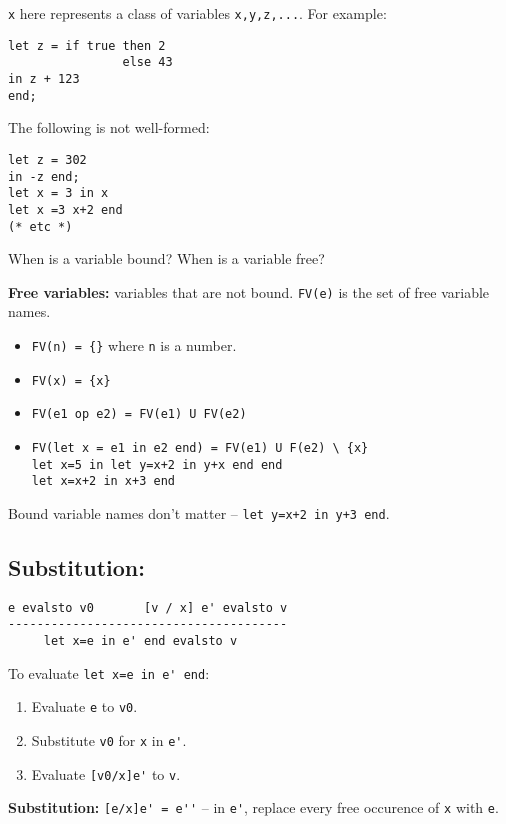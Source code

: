 \documentclass[11pt]{article}
\begin{document}
\verb~x~ here represents a class of variables \verb~x,y,z,...~. For example:
\begin{verbatim}
let z = if true then 2
                else 43
in z + 123
end;
\end{verbatim}

The following is not well-formed:
\begin{verbatim}
let z = 302
in -z end;
let x = 3 in x
let x =3 x+2 end
(* etc *)
\end{verbatim}

When is a variable bound? When is a variable free?

\textbf{Free variables:} variables that are not bound. \verb~FV(e)~ is the set of free variable names. 
\begin{itemize}
    \item \verb~FV(n) = {}~ where \verb~n~ is a number.
    \item \verb~FV(x) = {x}~
    \item \verb~FV(e1 op e2) = FV(e1) U FV(e2)~
    \item \verb~FV(let x = e1 in e2 end) = FV(e1) U F(e2) \ {x}~ \\
        \verb~let x=5 in let y=x+2 in y+x end end~ \\
        \verb~let x=x+2 in x+3 end~
\end{itemize}

Bound variable names don't matter -- \verb~let y=x+2 in y+3 end~.

\subsection{Substitution:} 

\begin{verbatim}
e evalsto v0       [v / x] e' evalsto v
---------------------------------------
     let x=e in e' end evalsto v
\end{verbatim}

To evaluate \verb~let x=e in e' end~:
\begin{enumerate}
    \item Evaluate \verb~e~ to \verb~v0~.
    \item Substitute \verb~v0~ for \verb~x~ in \verb~e'~.
    \item Evaluate \verb~[v0/x]e'~ to \verb~v~.
\end{enumerate}

\textbf{Substitution:} \verb~[e/x]e' = e''~ -- in \verb~e'~, replace every free occurence of \verb~x~ with \verb~e~.
\end{document}
